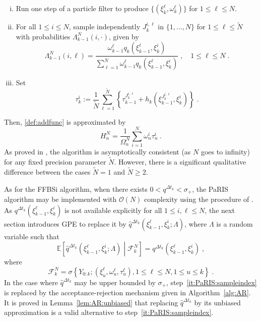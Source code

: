 \documentclass[12pt]{article}
\newcommand{\eqsp}{\;}
\newcommand{\1}{\mathrm{1}}
\newcommand{\qk}{q_{k}}
\begin{document}
\begin{enumerate}[(i)]
\item \label{it:PaRIS:filt} Run one step of a particle filter to produce $\{(\xi^{\ell}_k, \omega^{\ell}_k)\}$ for $1\le \ell \le N$.
\item \label{it:PaRIS:sampleindex} For all $1\le i \le N$, sample independently $J_k^{i,\ell}$ in $\{1,\ldots,N\}$ for $1\le \ell \le \widetilde N$ with probabilities $\Lambda_{k-1}^N(i,\cdot)$, given by
\[
\Lambda_{k-1}^N(i,\ell) = \frac{\omega^{\ell}_{k-1} \qk(\xi^{\ell}_{k-1},\xi_k^{i})}{\sum_{\ell=1}^N\omega^{\ell}_{k-1} \qk(\xi^{\ell}_{k-1},\xi_k^{i})}\eqsp,\quad 1\le \ell\le N\eqsp.
\]
\item \label{it:PaRIS:smooth} Set
\[
\tau^{i}_{k} := \frac{1}{\widetilde{N}} \sum^{\widetilde{N}}_{\ell=1} \left\{ \tau^{J_k^{i,\ell}}_{k-1} + h_{k} \left(\xi^{J_k^{i,\ell}}_{k-1}, \xi^{i}_{k}\right)  \right\}\eqsp.
\]
\end{enumerate}
Then, \eqref{def:addfunc} is approximated by
\[
H_n^N = \frac{1}{\Omega_n^N}\sum_{i=1}^N \omega^{i}_n \tau_n^i\eqsp.
\] 
As proved in \cite{olsson:westerborn:2016}, the algorithm is asymptotically consistent (as $N$ goes to infinity) for any fixed precision parameter $\tilde N$. However, there is a significant qualitative difference between the cases $\tilde{N} = 1$ and $\tilde{N} \geq 2$.

As for the FFBSi algorithm,  when there exists $0<q^{\Delta t_k}<\sigma_+$, the PaRIS algorithm may be implemented with $\mathcal{O}(N)$ complexity using the procedure of \cite{douc:garivier:moulines:olsson:2011}.
As $q^{\Delta t_k}(\xi^{\ell}_{k-1},\xi_k^{i})$ is not available explicitly for all $1\le i,\ell\le N$, the next section introduces GPE to replace it by $\widehat{q}^{\Delta t_k}(\xi^{\ell}_{k-1},\xi_k^{i};\Lambda)$, where $\Lambda$ is a random variable such that
\[
\mathbb{E}\left[\widehat{q}^{\Delta t_k}(\xi^{\ell}_{k-1},\xi_k^{i};\Lambda)\middle| \mathcal{F}_k^N\right] = q^{\Delta t_k}(\xi^{\ell}_{k-1},\xi_k^{i})\eqsp,
\]
where 
\[
\mathcal{F}_k^N = \sigma\left\{Y_{0:k};(\xi^{\ell}_{u},\omega^{\ell}_{u},\tau^{\ell}_{u}), 1\le \ell\le N, 1\le u\le k\right\}\eqsp.
\]
In the case where $\widehat{q}^{\Delta t_k}$ may be upper bounded by $\sigma_+$, step~\eqref{it:PaRIS:sampleindex} is replaced by the acceptance-rejection mechanism given in Algorithm~\ref{alg:AR}. It is proved in Lemma~\ref{lem:AR:unbiased} that replacing $\widehat{q}^{\Delta t_k}$ by its unbiased approximation is a valid alternative to step~\eqref{it:PaRIS:sampleindex}.
\end{document}
